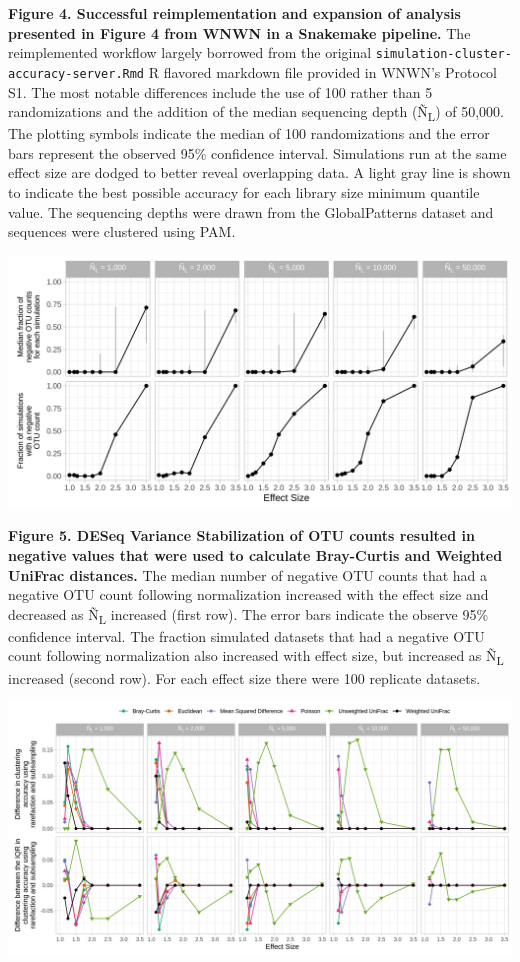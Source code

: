 \documentclass[
]{article}
\begin{document}
\textbf{Figure 4. Successful reimplementation and expansion of analysis
presented in Figure 4 from WNWN in a Snakemake pipeline.} The
reimplemented workflow largely borrowed from the original
\texttt{simulation-cluster-accuracy-server.Rmd} R flavored markdown file
provided in WNWN's Protocol S1. The most notable differences include the
use of 100 rather than 5 randomizations and the addition of the median
sequencing depth (Ñ\textsubscript{L}) of 50,000. The plotting symbols
indicate the median of 100 randomizations and the error bars represent
the observed 95\% confidence interval. Simulations run at the same
effect size are dodged to better reveal overlapping data. A light gray
line is shown to indicate the best possible accuracy for each library
size minimum quantile value. The sequencing depths were drawn from the
GlobalPatterns dataset and sequences were clustered using PAM.

\newpage

\includegraphics{figure_05.png}

\textbf{Figure 5. DESeq Variance Stabilization of OTU counts resulted in
negative values that were used to calculate Bray-Curtis and Weighted
UniFrac distances.} The median number of negative OTU counts that had a
negative OTU count following normalization increased with the effect
size and decreased as Ñ\textsubscript{L} increased (first row). The
error bars indicate the observe 95\% confidence interval. The fraction
simulated datasets that had a negative OTU count following normalization
also increased with effect size, but increased as Ñ\textsubscript{L}
increased (second row). For each effect size there were 100 replicate
datasets.

\newpage

\includegraphics{figure_06.png}
\end{document}
